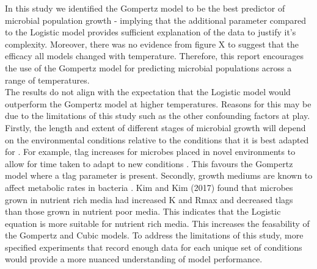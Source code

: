 \documentclass[11pt]{article}
\begin{document}
In this study we identified the Gompertz model to be the best predictor of microbial population growth - implying that the additional parameter compared to the Logistic model provides sufficient explanation of the data to justify it's complexity. Moreover, there was no evidence from figure X to suggest that the efficacy all models changed with temperature. Therefore, this report encourages the use of the Gompertz model for predicting microbial populations across a range of temperatures. \\

The results do not align with the expectation that the Logistic model would outperform the Gompertz model at higher temperatures. Reasons for this may be due to the limitations of this study such as the other confounding factors at play. Firstly, the length and extent of different stages of microbial growth will depend on the environmental conditions relative to the conditions that it is best adapted for \cite{Dey2020}. For example, tlag increases for microbes placed in novel environments to allow for time taken to adapt to new conditions \cite{Rolfe2012}. This favours the Gompertz model where a tlag parameter is present. Secondly, growth mediums are known to affect metabolic rates in bacteria \cite{KIM201764}. Kim and Kim (2017) found that microbes grown in nutrient rich media had increased K and Rmax and decreased tlags than those grown in nutrient poor media. This indicates that the Logistic equation is more suitable for nutrient rich media.  This increases the feasability of the Gompertz and Cubic models. To address the limitations of this study, more specified experiments that record enough data for each unique set of conditions would provide a more nuanced understanding of model performance.\\
\end{document}

